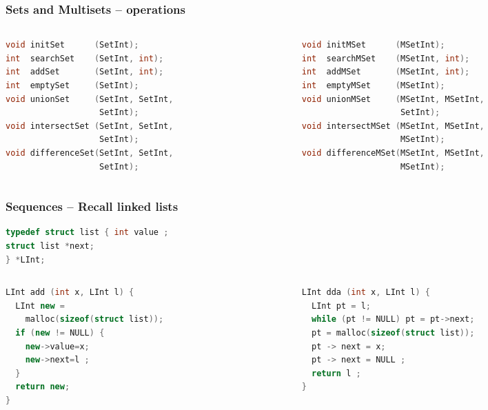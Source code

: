 \documentclass[aspectratio=169]{beamer}
\begin{document}
\begin{frame}[fragile]\frametitle{Sets and Multisets -- operations}
\centering

\begin{columns}
\begin{column}{.48\textwidth}
\begin{lstlisting}[language=C++,emph={MSetInt,SetInt}]
void initSet      (SetInt);
int  searchSet    (SetInt, int);
int  addSet       (SetInt, int);
int  emptySet     (SetInt);
void unionSet     (SetInt, SetInt,
                   SetInt);
void intersectSet (SetInt, SetInt,
                   SetInt);
void differenceSet(SetInt, SetInt,
                   SetInt);
\end{lstlisting}
%
\end{column}
\begin{column}{.50\textwidth}
%
\begin{lstlisting}[language=C++,emph={MSetInt,SetInt}]
void initMSet      (MSetInt); 
int  searchMSet    (MSetInt, int);
int  addMSet       (MSetInt, int);
int  emptyMSet     (MSetInt);
void unionMSet     (MSetInt, MSetInt,
                    SetInt);
void intersectMSet (MSetInt, MSetInt,
                    MSetInt); 
void differenceMSet(MSetInt, MSetInt,
                    MSetInt);
\end{lstlisting}
%
\end{column}
\end{columns}

\end{frame}

\begin{frame}[fragile]\frametitle{Sequences -- Recall linked lists}
  
\begin{lstlisting}[language=C++,emph={list,LInt}]
typedef struct list { int value ;
struct list *next;
} *LInt;
\end{lstlisting}

\begin{columns}
\begin{column}{.48\textwidth}
\begin{lstlisting}[language=C++, emph={prev,LInt},morekeywords={malloc}]
LInt add (int x, LInt l) {
  LInt new =
    malloc(sizeof(struct list));
  if (new != NULL) {
    new->value=x;
    new->next=l ;
  }
  return new;
}
\end{lstlisting}
%
\end{column}
\begin{column}{.50\textwidth}
%
\begin{lstlisting}[language=C++, emph={prev,LInt},morekeywords={malloc}]
LInt dda (int x, LInt l) {
  LInt pt = l;
  while (pt != NULL) pt = pt->next;
  pt = malloc(sizeof(struct list));
  pt -> next = x;
  pt -> next = NULL ;
  return l ;
}
\end{lstlisting}
%
\end{column}
\end{columns}
\end{frame}
\end{document}
